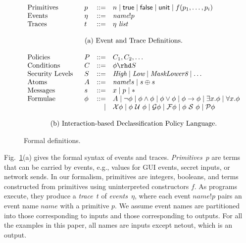 \documentclass{llncs}
\newcommand{\code}[1]{\textsf{#1}} %
\newcommand{\sfmt}[1]{\textsf{#1}}
\newcommand{\sch}{\textit{name}}
\newcommand{\sfalse}{\sfmt{false}}
\newcommand{\strue}{\sfmt{true}}
\newcommand{\sunit}{\sfmt{unit}}
\newcommand{\xv}{p}
\newcommand{\atom}{A}
\newcommand{\tr}{t\xspace}
\newcommand{\tnext}{\mathcal{X}}
\newcommand{\talways}{\mathcal{G}}
\newcommand{\tfuture}{\mathcal{F}}
\newcommand{\tuntil}{~\mathcal{U}~}
\newcommand{\tsince}{~\mathcal{S}~}
\newcommand{\tpast}{\mathcal{P}}
\newcommand{\limplies}{\rightarrow}
\newcommand{\evt}{\eta}
\begin{document}
\begin{figure}[t!]
  \small
  \centering
  \begin{displaymath}
    \begin{array}{p{1in}lrl}
      Primitives & \xv & ::= & n \mid \strue \mid \sfalse \mid \sunit \mid f(\xv_1, \ldots, \xv_i) \\
      Events & \evt & ::= & \sch ! p \\
      Traces & t & ::= & \evt ~ \textit{list} \\
      \\
      \multicolumn{4}{c}{\textrm{(a) Event and Trace Definitions.}} \\
      \\
      Policies & P & ::= & C_1, C_2, \ldots \\
      Conditions & C & ::= & \phi \rhd S\\
      Security Levels & S & ::= & \textit{High} \mid \textit{Low} \mid
      \textit{MaskLower8} \mid \ldots \\
      Atoms & \atom & ::= & \sch!s \mid s \oplus s \\
      Messages & s & ::= & x \mid p \mid \ast \\
      Formulae & \phi & ::= &
      \atom
      \mid \neg \phi
      \mid \phi \wedge \phi
      \mid \phi \vee \phi
      \mid \phi \limplies \phi
      \mid \exists x.\phi 
      \mid \forall x.\phi \\
      && \mid  & \tnext \phi
      \mid \phi \tuntil \phi
      \mid \talways \phi
      \mid \tfuture \phi
      \mid \phi \tsince \phi
      \mid \tpast \phi \\
      \\
      \multicolumn{4}{c}{\textrm{(b) Interaction-based Declassification Policy Language.}}
    \end{array}
  \end{displaymath}
  \caption{Formal definitions.}
  \label{fig:formalism}
\end{figure}

Fig.~\ref{fig:formalism}(a) gives the formal syntax of events and
traces.  \emph{Primitives}~$p$ are terms that can be carried by
events, e.g., values for GUI events, secret inputs, or network
sends.  In our formalism, primitives are integers, booleans, and terms
constructed from primitives using uninterpreted constructors $f$.  As
programs execute, they produce a \emph{trace}~$\tr$ of
\emph{events}~$\evt$, where each event $\sch!p$ pairs an event name
$\sch$ with a primitive $p$. We assume event names are partitioned
into those corresponding to inputs and those corresponding to
outputs. For all the examples in this paper, all names are inputs
except \code{netout}, which is an output.
\end{document}
